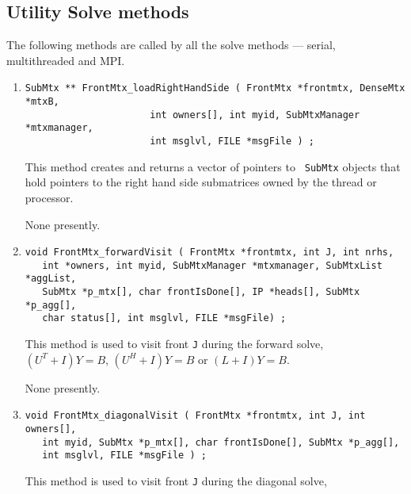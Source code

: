 \subsection{Utility Solve methods}
\label{subsection:FrontMtx:proto:utility-solve}
\par
The following methods are called by all the solve methods
--- serial, multithreaded and MPI.
\par
\begin{enumerate}
\item
\begin{verbatim}
SubMtx ** FrontMtx_loadRightHandSide ( FrontMtx *frontmtx, DenseMtx *mtxB, 
                      int owners[], int myid, SubMtxManager *mtxmanager,
                      int msglvl, FILE *msgFile ) ;
\end{verbatim}
This method creates and returns a vector of pointers to {\tt
SubMtx} objects that hold pointers to the right hand side
submatrices owned by the thread or processor.
\par {}
None presently.
\item
\begin{verbatim}
void FrontMtx_forwardVisit ( FrontMtx *frontmtx, int J, int nrhs, 
   int *owners, int myid, SubMtxManager *mtxmanager, SubMtxList *aggList,
   SubMtx *p_mtx[], char frontIsDone[], IP *heads[], SubMtx *p_agg[],
   char status[], int msglvl, FILE *msgFile) ;
\end{verbatim}
This method is used to visit front {\tt J} during the forward solve,
$(U^T + I)Y = B$, $(U^H + I)Y = B$ or $(L + I)Y = B$.
\par {}
None presently.
\item
\begin{verbatim}
void FrontMtx_diagonalVisit ( FrontMtx *frontmtx, int J, int owners[],
   int myid, SubMtx *p_mtx[], char frontIsDone[], SubMtx *p_agg[],
   int msglvl, FILE *msgFile ) ;
\end{verbatim}
This method is used to visit front {\tt J} during the diagonal solve,

\end{enumerate}
